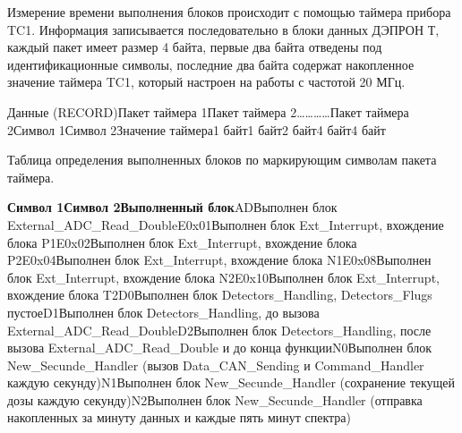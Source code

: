{Измерение времени выполнения блоков происходит с помощью таймера прибора TC1. Информация записывается последовательно в блоки данных ДЭПРОН Т, каждый пакет имеет размер 4 байта, первые два байта отведены под идентификационные символы, последние два байта содержат накопленное значение таймера TC1, который настроен на работы с частотой 20 МГц.


{\small Данные (RECORD)Пакет таймера 1Пакет таймера 2\ldots{}\ldots{}\ldots{}\ldots{}Пакет таймера 2Символ 1Символ 2Значение таймера1 байт1 байт2 байт4 байт4 байт}





Таблица определения выполненных блоков по маркирующим символам пакета таймера.


\textbf{Символ 1Символ 2Выполненный блок}ADВыполнен блок External\_ADC\_Read\_DoubleE0x01Выполнен блок Ext\_Interrupt, вхождение блока P1E0x02Выполнен блок Ext\_Interrupt, вхождение блока P2E0x04Выполнен блок Ext\_Interrupt, вхождение блока N1E0x08Выполнен блок Ext\_Interrupt, вхождение блока N2E0x10Выполнен блок Ext\_Interrupt, вхождение блока T2D0Выполнен блок Detectors\_Handling, Detectors\_Flugs пустоеD1Выполнен блок Detectors\_Handling, до вызова External\_ADC\_Read\_DoubleD2Выполнен блок Detectors\_Handling, после вызова External\_ADC\_Read\_Double и до конца функцииN0Выполнен блок New\_Secunde\_Handler (вызов Data\_CAN\_Sending и Command\_Handler каждую секунду)N1Выполнен блок New\_Secunde\_Handler (сохранение текущей дозы каждую секунду)N2Выполнен блок New\_Secunde\_Handler (отправка накопленных за минуту данных и каждые пять минут спектра)

}
